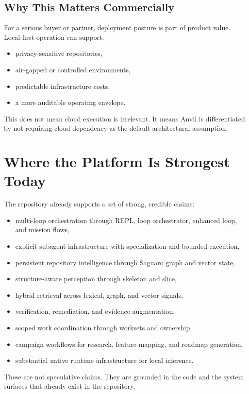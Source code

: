 \documentclass[11pt,a4paper]{article}
\begin{document}
\subsection{Why This Matters Commercially}
For a serious buyer or partner, deployment posture is part of product value. Local-first operation can support:
\begin{itemize}
    \item privacy-sensitive repositories,
    \item air-gapped or controlled environments,
    \item predictable infrastructure costs,
    \item a more auditable operating envelope.
\end{itemize}

This does not mean cloud execution is irrelevant. It means Anvil is differentiated by not requiring cloud dependency as the default architectural assumption.

\section{Where the Platform Is Strongest Today}
The repository already supports a set of strong, credible claims:
\begin{itemize}
    \item multi-loop orchestration through REPL, loop orchestrator, enhanced loop, and mission flows,
    \item explicit subagent infrastructure with specialization and bounded execution,
    \item persistent repository intelligence through Saguaro graph and vector state,
    \item structure-aware perception through skeleton and slice,
    \item hybrid retrieval across lexical, graph, and vector signals,
    \item verification, remediation, and evidence augmentation,
    \item scoped work coordination through worksets and ownership,
    \item campaign workflows for research, feature mapping, and roadmap generation,
    \item substantial native runtime infrastructure for local inference.
\end{itemize}

These are not speculative claims. They are grounded in the code and the system surfaces that already exist in the repository.
\end{document}
